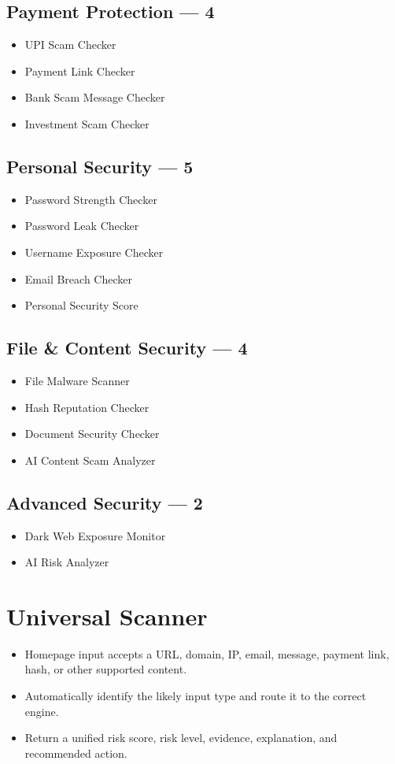 \documentclass[11pt,a4paper]{article}
\begin{document}
\subsection*{Payment Protection — 4}
\begin{itemize}[noitemsep]
    \item UPI Scam Checker
    \item Payment Link Checker
    \item Bank Scam Message Checker
    \item Investment Scam Checker
\end{itemize}

\subsection*{Personal Security — 5}
\begin{itemize}[noitemsep]
    \item Password Strength Checker
    \item Password Leak Checker
    \item Username Exposure Checker
    \item Email Breach Checker
    \item Personal Security Score
\end{itemize}

\subsection*{File \& Content Security — 4}
\begin{itemize}[noitemsep]
    \item File Malware Scanner
    \item Hash Reputation Checker
    \item Document Security Checker
    \item AI Content Scam Analyzer
\end{itemize}

\subsection*{Advanced Security — 2}
\begin{itemize}[noitemsep]
    \item Dark Web Exposure Monitor
    \item AI Risk Analyzer
\end{itemize}

\section{Universal Scanner}
\begin{itemize}[noitemsep]
    \item Homepage input accepts a URL, domain, IP, email, message, payment link, hash, or other supported content.
    \item Automatically identify the likely input type and route it to the correct engine.
    \item Return a unified risk score, risk level, evidence, explanation, and recommended action.
\end{itemize}
\end{document}
